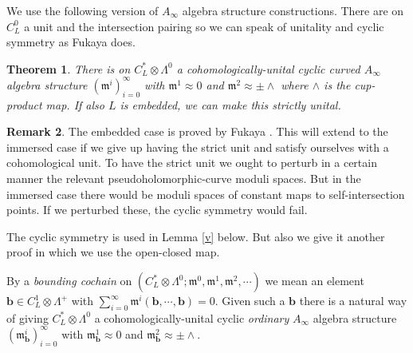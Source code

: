 \documentclass{article}
\theoremstyle{plain}%
\newtheorem{thm}{Theorem}[section]
\theoremstyle{definition}
\newtheorem{rem}[thm]{Remark}
\numberwithin{equation}{section}
\numberwithin{figure}{section}
\def\l{\label}
\def\fm{\mathfrak m}
\def\px{\approx}
\def\Z{{\mathbin{\mathbb Z}}}
\def\be{\beta}
\def\om{\omega}
\def\La{\Lambda}
\def\w{\wedge}
\def\ot{\otimes}
\def\iy{\infty}
\def\t{\times}
\def\sb{\subseteq}
\def\b{{\mathbf{b}}}
\begin{document}
We use the following version of $A_\iy$ algebra structure constructions.
There are on $C_L^0$ a unit and the intersection pairing so we can speak of unitality and cyclic symmetry as
Fukaya \cite{Fuk1} does.
\begin{thm}\l{A}
There is on $C_L^*\ot\La^0$ a cohomologically-unital cyclic
curved $A_\iy$ algebra structure $(\fm^i)_{i=0}^\iy$ with $\fm^1\px0$ and $\fm^2\px\pm\w$ where $\w$ is the cup-product map.
If also $L$ is embedded, we can make this strictly unital. 
\end{thm}
\begin{rem}
The embedded case is proved by Fukaya \cite{Fuk1}.
This will extend to the immersed case if we give up having the strict unit and satisfy ourselves with
a cohomological unit.
To have the strict unit we ought to perturb in a certain manner the relevant pseudoholomorphic-curve moduli spaces.
But in the immersed case there would be moduli spaces of constant maps to
self-intersection points. If we perturbed these, the cyclic symmetry would fail.

The cyclic symmetry is used in Lemma \ref{v} below.
But also we give it another proof in which we use the open-closed map.
\end{rem}

By a {\it bounding cochain} on $(C_L^*\ot\La^0;\fm^0,\fm^1,\fm^2,\cdots)$
we mean an element $\b\in C^1_L\ot\La^+$ with $\sum_{i=0}^\iy\fm^i(\b,\cdots,\b)=0.$
Given such a $\b$ there is a natural way of giving $C_L^*\ot\La^0$
a cohomologically-unital cyclic {\it ordinary} $A_\iy$ algebra structure
$(\fm^i_\b )_{i=0}^\iy$ with $\fm_\b^1\px0$ and $\fm_\b^2\px\pm\w.$
\end{document}
